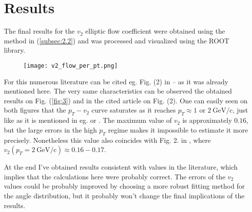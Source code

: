 \section{Results} \label{sec:3}
The final results for the $v_{2}$ elliptic flow coefficient were obtained using the method in (\ref{subsec:2.2}) and was processed and visualized using the ROOT library.

\begin{figure}[h]
	\centering
	\texttt{[image: v2\_flow\_per\_pt.png]}
	\label{fig:4}
\end{figure}

For this numerous literature can be cited eg. Fig. (2) in \citep{Collaboration2003} -- as it was already mentioned here. The very same characteristics can be observed the obtained results on Fig. (\ref{fig:3}) and in the cited article on Fig. (2). One can easily seen on both figures that the $p_{T} - v_{2}$ curve saturates as it reaches $p_{T} \approx 1$ or $2\ \mathrm{GeV}/\mathrm{c}$, just like as it is mentioned in eg. \citep{Collaboration2003} or \citep{Retiere2004}. The maximum value of $v_{2}$ is approximately $0.16$, but the large errors in the high $p_{T}$ regime makes it impossible to estimate it more precisely. Nonetheless this value also coincides with Fig. 2. in \citep{Collaboration2003}, where $v_{2} \left( p_{T} = 2\ \mathrm{GeV}/\mathrm{c} \right) \approx 0.16 - 0.17$.

At the end I've obtained results consistent with values in the literature, which implies that the calculations here were probably correct. The errors of the $v_{2}$ values could be probably improved by choosing a more robust fitting method for the angle distribution, but it probably won't change the final implications of the results.